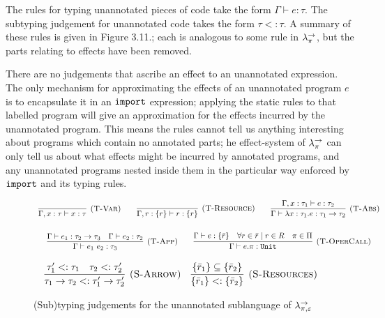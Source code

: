 The rules for typing unannotated pieces of code take the form $\Gamma \vdash e: \tau$. The subtyping judgement for unannotated code takes the form $\tau <: \tau$. A summary of these rules is given in Figure 3.11.; each is analogous to some rule in $\lambda^{\rightarrow}_{\pi}$, but the parts relating to effects have been removed.

There are no judgements that ascribe an effect to an unannotated expression. The only mechanism for approximating the effects of an unannotated program $e$ is to encapsulate it in an $\mathtt{import}$ expression; applying the static rules to that labelled program will give an approximation for the effects incurred by the unannotated program. This means the rules cannot tell us anything interesting about programs which contain no annotated parts; he effect-system of $\lambda^{\rightarrow}_{\pi}$ can only tell us about what effects might be incurred by annotated programs, and any unannotated programs nested inside them in the particular way enforced by $\mathtt{import}$ and its typing rules.

\begin{figure}[h]


\[
\begin{array}{c}


\infer[\textsc{(T-Var)}]
	{\Gamma, x: \tau \vdash x: \tau}
	{}
~~~~~~
\infer[\textsc{(T-Resource)}]
	{\Gamma, r: \{ r \} \vdash r : \{ r \}}
	{}

~~~~~~
\infer[\textsc{(T-Abs)}]
	{\Gamma \vdash \lambda x: \tau_1.e : \tau_1 \rightarrow \tau_2}
	{\Gamma, x: \tau_1 \vdash e: \tau_2}\\[4ex]
	
\infer[\textsc{(T-App)}]
	{\Gamma \vdash e_1~e_2: \tau_3}
	{\Gamma \vdash e_1: \tau_2 \rightarrow \tau_3 & \Gamma \vdash e_2: \tau_2}
~~~~~~
\infer[\textsc{(T-OperCall)}]
	{\Gamma \vdash e.\pi: \kwa{Unit}}
	{\Gamma \vdash e: \{ \bar r \} & \forall r \in \bar r \mid r \in R & \pi \in \Pi}

\end{array}
\]



\fbox{$\tau <: \tau$}

\[
\begin{array}{c}

\infer[\textsc{(S-Arrow)}]
	{ \tau_1 \rightarrow \tau_2 <: \tau_1' \rightarrow \tau_2' }
	{ \tau_1' <: \tau_1 & \tau_2 <: \tau_2' }
	~~~
\infer[\textsc{(S-Resources)}]
	{ \{ \bar r_1 \} <: \{ \bar r_2 \} }
	{ \{ \bar r_1 \} \subseteq \{ \bar r_2 \} }

\end{array}
\]

\vspace{-7pt}
\caption{(Sub)typing judgements for the unannotated sublanguage of $\lambda^{\rightarrow}_{\pi, \varepsilon}$}
\label{This is the label.}
\end{figure}

